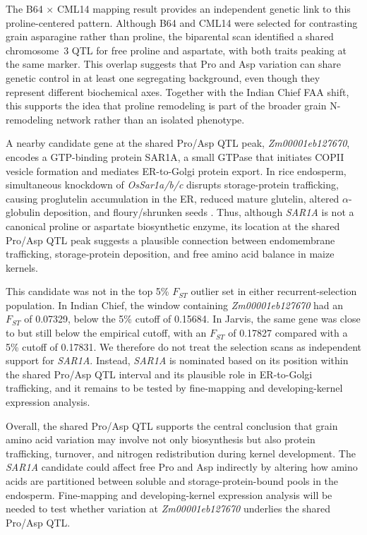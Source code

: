 The B64 $\times$ CML14 mapping result provides an independent genetic link to this proline-centered pattern. Although B64 and CML14 were selected for contrasting grain asparagine rather than proline, the biparental scan identified a shared chromosome~3 QTL for free proline and aspartate, with both traits peaking at the same marker. This overlap suggests that Pro and Asp variation can share genetic control in at least one segregating background, even though they represent different biochemical axes. Together with the Indian Chief FAA shift, this supports the idea that proline remodeling is part of the broader grain N-remodeling network rather than an isolated phenotype.

A nearby candidate gene at the shared Pro/Asp QTL peak, \textit{Zm00001eb127670}, encodes a GTP-binding protein SAR1A, a small GTPase that initiates COPII vesicle formation and mediates ER-to-Golgi protein export. In rice endosperm, simultaneous knockdown of \textit{OsSar1a/b/c} disrupts storage-protein trafficking, causing proglutelin accumulation in the ER, reduced mature glutelin, altered $\alpha$-globulin deposition, and floury/shrunken seeds \citep{Tian2013Sar1}. Thus, although \textit{SAR1A} is not a canonical proline or aspartate biosynthetic enzyme, its location at the shared Pro/Asp QTL peak suggests a plausible connection between endomembrane trafficking, storage-protein deposition, and free amino acid balance in maize kernels.

This candidate was not in the top 5\% $F_{ST}$ outlier set in either recurrent-selection population. In Indian Chief, the window containing \textit{Zm00001eb127670} had an $F_{ST}$ of 0.07329, below the 5\% cutoff of 0.15684. In Jarvis, the same gene was close to but still below the empirical cutoff, with an $F_{ST}$ of 0.17827 compared with a 5\% cutoff of 0.17831. We therefore do not treat the selection scans as independent support for \textit{SAR1A}. Instead, \textit{SAR1A} is nominated based on its position within the shared Pro/Asp QTL interval and its plausible role in ER-to-Golgi trafficking, and it remains to be tested by fine-mapping and developing-kernel expression analysis.

Overall, the shared Pro/Asp QTL supports the central conclusion that grain amino acid variation may involve not only biosynthesis but also protein trafficking, turnover, and nitrogen redistribution during kernel development. The \textit{SAR1A} candidate could affect free Pro and Asp indirectly by altering how amino acids are partitioned between soluble and storage-protein-bound pools in the endosperm. Fine-mapping and developing-kernel expression analysis will be needed to test whether variation at \textit{Zm00001eb127670} underlies the shared Pro/Asp QTL.


